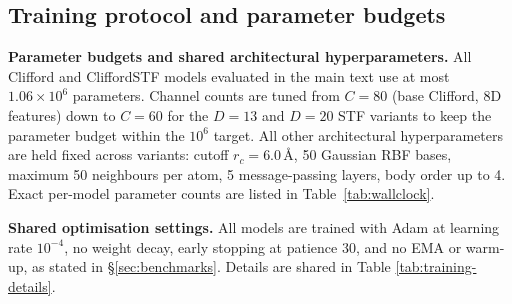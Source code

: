 \subsection{Training protocol and parameter budgets}\label{supp:protocol}

\textbf{Parameter budgets and shared architectural hyperparameters.} All Clifford and CliffordSTF models evaluated in the main text use at most $1.06\times 10^6$ parameters. Channel counts are tuned from $C{=}80$ (base Clifford, 8D features) down to $C{=}60$ for the $D{=}13$ and $D{=}20$ STF variants to keep the parameter budget within the $10^6$ target. All other architectural hyperparameters are held fixed across variants: cutoff $r_c = 6.0$\,\AA, 50 Gaussian RBF bases, maximum 50 neighbours per atom, 5 message-passing layers, body order up to 4. Exact per-model parameter counts are listed in Table~\ref{tab:wallclock}.

\textbf{Shared optimisation settings.} All models are trained with Adam at learning rate $10^{-4}$, no weight decay, early stopping at patience 30, and no EMA or warm-up, as stated in \S\ref{sec:benchmarks}. Details are shared in Table \ref{tab:training-details}.

